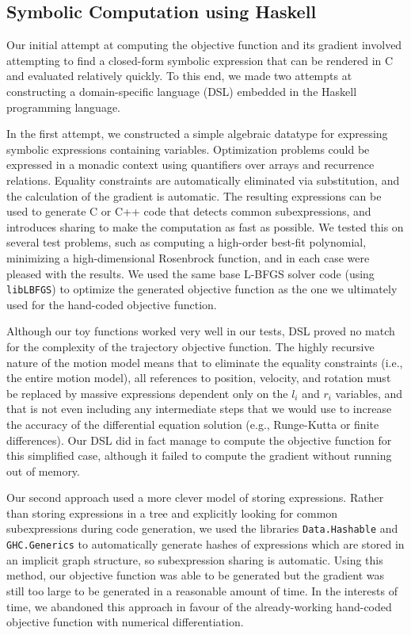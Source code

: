 \documentclass{report}
\begin{document}
\subsection{Symbolic Computation using Haskell}
Our initial attempt at computing the objective function and its gradient
involved attempting to find a closed-form symbolic expression that can be
rendered in C and evaluated relatively quickly. To this end, we made two attempts
at constructing a domain-specific language (DSL) embedded in the Haskell programming
language.

In the first attempt, we constructed a simple algebraic datatype for expressing
symbolic expressions containing variables. Optimization problems could be
expressed in a monadic context using quantifiers over arrays and recurrence
relations. Equality constraints are automatically eliminated via substitution,
and the calculation of the gradient is automatic. The resulting expressions can
be used to generate C or C++ code that detects common subexpressions, and
introduces sharing to make the computation as fast as possible. We tested this
on several test problems, such as computing a high-order best-fit polynomial,
minimizing a high-dimensional Rosenbrock function, and in each case were
pleased with the results. We used the same base L-BFGS solver code (using
\texttt{libLBFGS}) to optimize the generated objective function as the one we
ultimately used for the hand-coded objective function.

Although our toy functions worked very well in our tests, DSL proved no match
for the complexity of the trajectory objective function. The highly recursive
nature of the motion model means that to eliminate the equality constraints (i.e.,
the entire motion model), all references to position, velocity, and rotation
must be replaced by massive expressions dependent only on the $l_i$ and $r_i$
variables, and that is not even including any intermediate steps that we would
use to increase the accuracy of the differential equation solution (e.g., Runge-Kutta
or finite differences). Our DSL did in fact manage to compute the objective function
for this simplified case, although it failed to compute the gradient without
running out of memory.

Our second approach used a more clever model of storing expressions. Rather than
storing expressions in a tree and explicitly looking for common subexpressions
during code generation, we used the libraries \texttt{Data.Hashable} and \texttt{GHC.Generics}
to automatically generate hashes of expressions which are stored in an implicit
graph structure, so subexpression sharing is automatic. Using this method, our
objective function was able to be generated but the gradient was still too
large to be generated in a reasonable amount of time. In the interests of time,
we abandoned this approach in favour of the already-working hand-coded objective
function with numerical differentiation.
\end{document}
